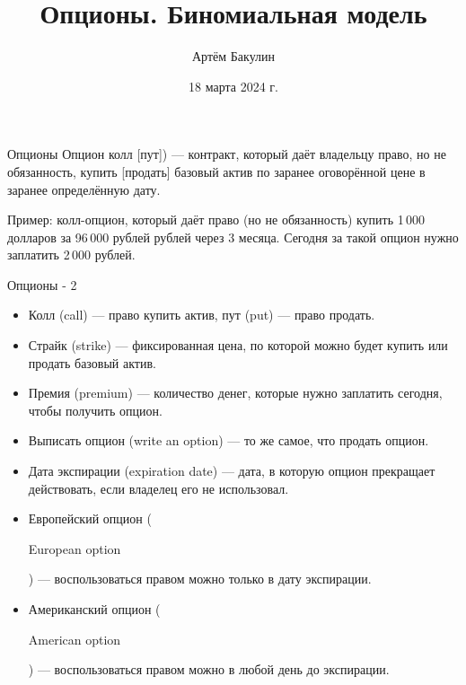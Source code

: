 \documentclass{beamer}
\title{Опционы. Биномиальная модель}
\author{Артём Бакулин}
\date{18 марта 2024 г.}
\newcommand{\en}[1]{\begin{otherlanguage}{english}#1\end{otherlanguage}}
\newcommand{\usdrubstrike}{96}
\begin{document}
\begin{frame}
\titlepage
\end{frame}



\begin{frame}{Опционы}
\justifying
\alert{Опцион колл [пут])} --- контракт, который даёт владельцу право, но не обязанность, купить [продать] базовый актив по заранее оговорённой цене в заранее определённую дату. 

\justify
Пример: колл-опцион, который даёт право (но не обязанность) купить 1\,000 долларов за \usdrubstrike\,000 рублей рублей через 3 месяца. Сегодня за такой опцион нужно заплатить 2\,000 рублей.
\end{frame}



\begin{frame}{Опционы - 2}
\begin{itemize}
\justifying
\item \alert{Колл} (call) --- право купить актив, \alert{пут} (put) --- право продать.
\item \alert{Страйк} (strike) --- фиксированная цена, по которой можно будет купить или продать базовый актив.
\item \alert{Премия} (premium) --- количество денег, которые нужно заплатить сегодня, чтобы получить опцион.
\item \alert{Выписать} опцион (write an option) --- то же самое, что продать опцион.
\item \alert{Дата экспираци}и (expiration date) --- дата, в которую опцион прекращает действовать, если владелец его не использовал.
\item \alert{Европейский} опцион (\en{European option}) --- воспользоваться правом можно только в дату экспирации.
\item \alert{Американский} опцион (\en{American option}) --- воспользоваться правом можно в любой день до экспирации.
\end{itemize}
\end{frame}



\newcommand{\circlewithtext}[3]{
    \node[circle, fill, inner sep = 1.5pt] at (#1, #2) {};
    \node[anchor = north] at (#1, #2) {#3};
}
\end{document}
